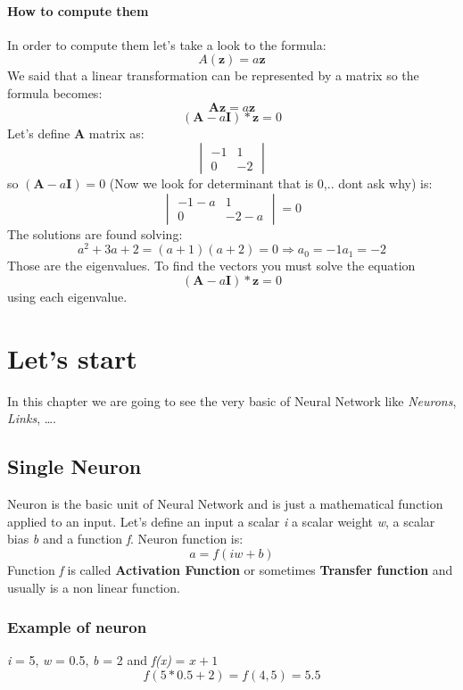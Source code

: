 \documentclass[12pt,a4paper,twoside,openright]{scrbook}
\begin{document}
\subsubsection{How to compute them}
In order to compute them let's  take a look to the formula:
\[ A(\textbf{z}) = a\textbf{z} \]
We said that a linear transformation can be represented by a matrix so the formula becomes:
 \[ \textbf{A}\textbf{z} = a\textbf{z} \]
 \[(\textbf{A} - a\textbf{I}) * \textbf{z} = 0\]
 Let's define \textbf{A} matrix as:
 \[\begin{vmatrix}
-1 & 1\\0 & -2 
 \end{vmatrix}\]
 so $(\textbf{A} - a\textbf{I}) = 0$ (Now we look for determinant that is 0,.. dont ask why) is:
  \[\begin{vmatrix}
-1 - a & 1\\0 & -2 - a
 \end{vmatrix} = 0 \]
The solutions are found solving:
\[a^2 + 3a + 2 = (a + 1)(a + 2) = 0 \Rightarrow a_0 = -1 a_1=-2\]
Those are the eigenvalues. To find the vectors you must solve the equation \[(\textbf{A} - a\textbf{I}) * \textbf{z} = 0\] using each eigenvalue.
\chapter{Let's start}

In this chapter we are going to see the very basic of Neural Network like \textit{Neurons}, \textit{Links}, \ldots.

\section{Single Neuron}
Neuron is the basic unit of Neural Network and is just a mathematical function applied to an input.
Let's define an input a scalar \textit{i} a scalar weight \textit{w}, a scalar bias \textit{b} and a function \textit{f}.
Neuron function is:
\begin{equation}
a = f(iw + b)
\end{equation}
Function \textit{f} is called \textbf{Activation Function} or sometimes \textbf{Transfer function} and usually is a non linear function.

\subsection{Example of neuron}
\textit{i} = 5, \textit{w} = 0.5, \textit{b} = 2 and \textit{f(x)} = $x + 1$  
\begin{equation}
f(5*0.5 + 2) = f(4,5) = 5.5
\end{equation}
\end{document}

